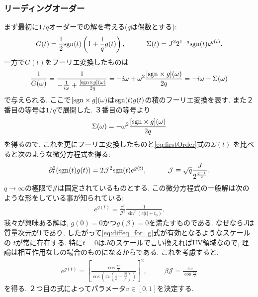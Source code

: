 \subsubsection{リーディングオーダー}
まず最初に$1/q$オーダーでの解を考える($q$は偶数とする):
\begin{align}
  G(t) = \frac{1}{2}\mathrm{sgn}(t)\left(1 + \frac{1}{q}g(t)\right),
  \hspace{30pt}
  \Sigma(t) = J^22^{1-q}\mathrm{sgn}(t)e^{g(t)}.
  \label{eq:firstOrder}
\end{align}
一方で$G(t)$をフーリエ変換したものは
\begin{align}
\frac{1}{G(\omega)}
	= \frac{1}{-\frac{1}{i\omega} + \frac{[\mathrm{sgn} \times g](\omega)}{2q}}
	= -i\omega + \omega^2\frac{[\mathrm{sgn} \times g](\omega)}{2q}
	= -i\omega - \Sigma(\omega)
\end{align}
で与えられる. 
ここで$[\mathrm{sgn} \times g](\omega)$は$\mathrm{sgn}(t)g(t)$の積のフーリエ変換を表す. 
また２番目の等号は$1/q$で展開した. 
３番目の等号より
\begin{align}
	\Sigma(\omega) = -\omega^2\frac{[\mathrm{sgn} \times g](\omega)}{2q}
\end{align}
を得るので, これを更にフーリエ変換したものと\eqref{eq:firstOrder}式の$\Sigma(t)$
を比べると次のような微分方程式を得る:
\begin{align}
\partial_t^2(\mathrm{sgn}(t)g(t)) = 2\mathcal{J}^2\mathrm{sgn}(t)e^{g(t)},
\hspace{30pt}
\mathcal{J} \equiv \sqrt{q}\frac{J}{2^{\frac{q-1}{2}}}.
\label{eq:diffeq_for_g}
\end{align}
$q \to \infty$の極限で$\mathcal{J}$は固定されているものとする. 
この微分方程式の一般解は次のような形をしている事が知られている:
\begin{align}
e^{g(t)} = \frac{c^2}{\mathcal{J}^2}\frac{1}{\sin^2(c|t| + t_0)}.
\end{align}
我々が興味ある解は, $g(0)=0$かつ$g(\beta)=0$を満たすものである. 
なぜなら$J$は質量次元が1であり, したがって\eqref{eq:diffeq_for_g}式が有効となるようなスケールの
$t$が常に存在する. 
特に$t=0$は$J$のスケールで言い換えればUV領域なので, 理論は相互作用なしの場合のものになるからである. 
これを考慮すると, 
\begin{align}
	e^{g(t)} = \left[
		\frac{\cos\frac{\pi v}{2}}{\cos\left(\pi v(\frac{1}{2} - \frac{|t|}{\beta})\right)}
		\right]^2,
	\hspace{30pt}
	\beta\mathcal{J} = \frac{\pi v}{\cos\frac{\pi v}{2}}
	\label{eq:explicit_g}
\end{align}
を得る. ２つ目の式によってパラメータ$v\in[0, 1]$を決定する. 

